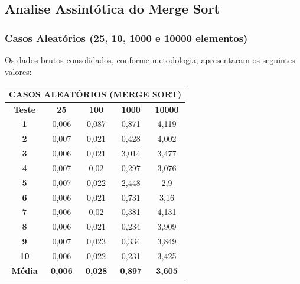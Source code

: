 \documentclass[a4paper, 12pt]{article}
\begin{document}
\vspace{0.8cm}
\subsection{Analise Assintótica do Merge Sort}


\subsubsection{Casos Aleatórios (25, 10, 1000 e 10000 elementos)}

Os dados brutos consolidados, conforme metodologia, apresentaram os seguintes valores:
\vspace{0.2cm}

\begin{minipage}{1.0\textwidth}
  \begin{minipage}[c]{0.49\textwidth}
  \centering
\begin{tabular}{ccccc}

                   \multicolumn{ 5}{c}{{\bf CASOS ALEATÓRIOS (MERGE SORT)}} \\
\hline
{\bf Teste} &   {\bf 25} &  {\bf 100} & {\bf 1000} & {\bf 10000} \\
\hline
   {\bf 1} &      0,006 &      0,087 &      0,871 &      4,119 \\
\hline
   {\bf 2} &      0,007 &      0,021 &      0,428 &      4,002 \\
\hline
   {\bf 3} &      0,006 &      0,021 &      3,014 &      3,477 \\
\hline
   {\bf 4} &      0,007 &       0,02 &      0,297 &      3,076 \\
\hline
   {\bf 5} &      0,007 &      0,022 &      2,448 &        2,9 \\
\hline
   {\bf 6} &      0,006 &      0,021 &      0,731 &       3,16 \\
\hline
   {\bf 7} &      0,006 &       0,02 &      0,381 &      4,131 \\
\hline
   {\bf 8} &      0,006 &      0,021 &      0,234 &      3,909 \\
\hline
   {\bf 9} &      0,007 &      0,023 &      0,334 &      3,849 \\
\hline
  {\bf 10} &      0,006 &      0,022 &      0,231 &      3,425 \\
\hline
{\bf Média} & {\bf 0,006} & {\bf 0,028} & {\bf 0,897} & {\bf 3,605} \\
\hline
\end{tabular}  



\end{minipage}
\end{minipage}
\end{document}
